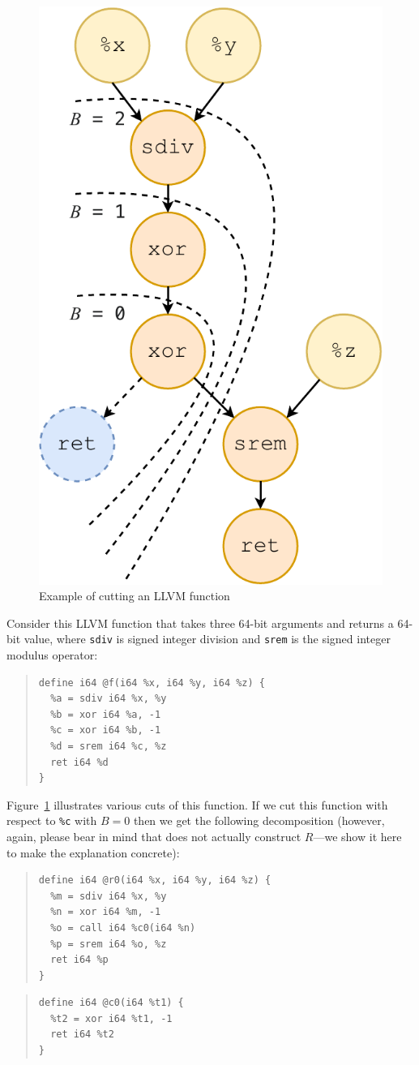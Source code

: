 \begin{figure}
  \centering
  \includegraphics[width=0.28\linewidth]{figures/cut-depth.pdf}
  \caption{Example of cutting an LLVM function}
  \label{fig:cut-depth}
\end{figure}

Consider this LLVM function that takes three 64-bit arguments and
returns a 64-bit value, where \texttt{sdiv} is signed integer division
and \texttt{srem} is the signed integer modulus operator:


{\small\begin{quote}
\begin{verbatim}
define i64 @f(i64 %x, i64 %y, i64 %z) {
  %a = sdiv i64 %x, %y
  %b = xor i64 %a, -1
  %c = xor i64 %b, -1
  %d = srem i64 %c, %z
  ret i64 %d
}
\end{verbatim}
\end{quote}}

Figure~\ref{fig:cut-depth} illustrates various cuts of this function.
%
If we cut this function with respect to \texttt{\%c} with $B = 0$ then
we get the following decomposition (however, again, please bear in
mind that \minotaur{} does not actually construct $R$---we show it here to
make the explanation concrete):

\begin{multicols}{2}
{\small\begin{quote}
\begin{verbatim}
define i64 @r0(i64 %x, i64 %y, i64 %z) {
  %m = sdiv i64 %x, %y
  %n = xor i64 %m, -1
  %o = call i64 %c0(i64 %n)
  %p = srem i64 %o, %z
  ret i64 %p
}
\end{verbatim}
\end{quote}}
\columnbreak
{\small\begin{quote}
\begin{verbatim}
define i64 @c0(i64 %t1) {
  %t2 = xor i64 %t1, -1
  ret i64 %t2
}
\end{verbatim}
\end{quote}}
\end{multicols}


